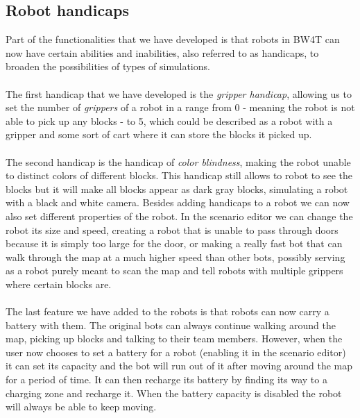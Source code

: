 \documentclass[]{article}
\begin{document}
\subsection{Robot handicaps}
Part of the functionalities that we have developed is that robots in BW4T can now have certain abilities and inabilities, also referred to as handicaps, to broaden the possibilities of types of simulations.\\
\\
The first handicap that we have developed is the \textit{gripper handicap}, allowing us to set the number of \textit{grippers} of a robot in a range from 0 - meaning the robot is not able to pick up any blocks - to 5, which could be described as a robot with a gripper and some sort of cart where it can store the blocks it picked up.\\
\\
The second handicap is the handicap of \textit{color blindness}, making the robot unable to distinct colors of different blocks. This handicap still allows to robot to see the blocks but it will make all blocks appear as dark gray blocks, simulating a robot with a black and white camera.
Besides adding handicaps to a robot we can now also set different properties of the robot. In the scenario editor we can change the robot its size and speed, creating a robot that is unable to pass through doors because it is simply too large for the door, or making a really fast bot that can walk through the map at a much higher speed than other bots, possibly serving as a robot purely meant to scan the map and tell robots with multiple grippers where certain blocks are.\\
\\
The last feature we have added to the robots is that robots can now carry a battery with them. The original bots can always continue walking around the map, picking up blocks and talking to their team members. However, when the user now chooses to set a battery for a robot (enabling it in the scenario editor) it can set its capacity and the bot will run out of it after moving around the map for a period of time. It can then recharge its battery by finding its way to a charging zone and recharge it. When the battery capacity is disabled the robot will always be able to keep moving.
\end{document}
